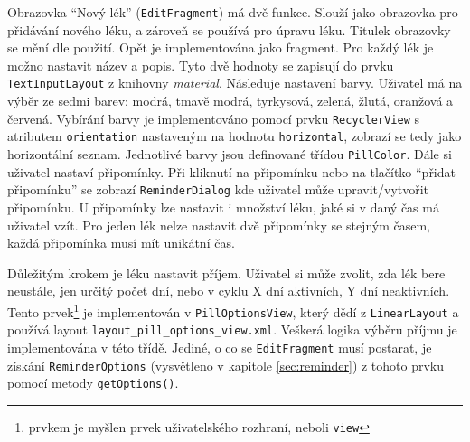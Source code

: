 \documentclass[../TakeYourPill.tex]{subfiles}
\begin{document}
Obrazovka \enquote{Nový lék} (\texttt{EditFragment}) má dvě funkce. Slouží jako obrazovka pro přidávání nového léku, a zároveň se používá pro úpravu léku. Titulek obrazovky se mění dle použití. Opět je implementována jako fragment. Pro každý lék je možno nastavit název a popis. Tyto dvě hodnoty se zapisují do prvku \texttt{TextInputLayout} z knihovny \textit{material}. Následuje nastavení barvy. Uživatel má na výběr ze sedmi barev: modrá, tmavě modrá, tyrkysová, zelená, žlutá, oranžová a červená. Vybírání barvy je implementováno pomocí prvku \texttt{RecyclerView} s atributem \texttt{orientation} nastaveným na hodnotu \texttt{horizontal}, zobrazí se tedy jako horizontální seznam. Jednotlivé barvy jsou definované třídou \texttt{PillColor}. Dále si uživatel nastaví připomínky. Při kliknutí na připomínku nebo na tlačítko \enquote{přidat připomínku} se zobrazí \texttt{ReminderDialog} kde uživatel může upravit/vytvořit připomínku. U připomínky lze nastavit i množství léku, jaké si v daný čas má uživatel vzít. Pro jeden lék nelze nastavit dvě připomínky se stejným časem, každá připomínka musí mít unikátní čas. 

Důležitým krokem je léku nastavit příjem. Uživatel si může zvolit, zda lék bere neustále, jen určitý počet dní, nebo v cyklu X dní aktivních, Y dní neaktivních. Tento prvek\footnote{prvkem je myšlen prvek uživatelského rozhraní, neboli \texttt{view}} je implementován v \texttt{PillOptionsView}, který dědí z \texttt{LinearLayout} a používá layout \texttt{layout\_pill\_options\_view.xml}. Veškerá logika výběru příjmu je implementována v této třídě. Jediné, o co se \texttt{EditFragment} musí postarat, je získání \texttt{ReminderOptions} (vysvětleno v kapitole \ref{sec:reminder}) z tohoto prvku pomocí metody \texttt{getOptions()}.
\end{document}
